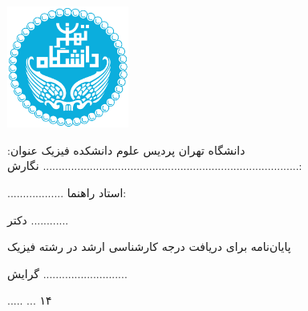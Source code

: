 \documentclass[a4paper,oneside]{book}
\begin{document}
	\thispagestyle{empty}
	\begin{center}
		\includegraphics[width=0.3\textwidth]{./../default_pics/logo.png}
		
		\vspace{0.5cm}
		{\Huge دانشگاه تهران}
		\linebreak
		\linebreak
		{\huge پردیس علوم}
		\linebreak
		\linebreak
		{\LARGE دانشکده فیزیک}
		\linebreak
		\linebreak
		\linebreak
		\linebreak
		{\LARGE عنوان:}
		\linebreak
		{\LARGE
			..................................................................................}
		\linebreak
		\linebreak
		\linebreak
		{\LARGE نگارش:}
		
		{\LARGE ..................}
		\linebreak
		\linebreak
		\linebreak
		{\LARGE استاد راهنما:}
		
		{\LARGE دکتر ............}
		\linebreak
		\linebreak
		{\LARGE پایان‌نامه برای دریافت درجه کارشناسی ارشد در رشته فیزیک
			
			گرایش ...........................}
		\linebreak
		\linebreak
		\linebreak
		{\LARGE
			 .....   ... ۱۴}
	\end{center}
\end{document}
